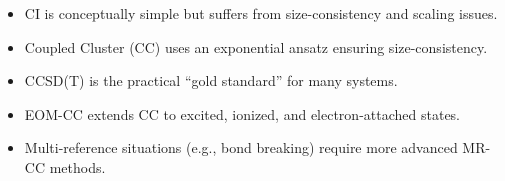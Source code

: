 \documentclass[12pt]{article}
\begin{document}
\begin{itemize}
    \item CI is conceptually simple but suffers from size-consistency and scaling issues.
    \item Coupled Cluster (CC) uses an exponential ansatz ensuring size-consistency.
    \item CCSD(T) is the practical ``gold standard'' for many systems.
    \item EOM-CC extends CC to excited, ionized, and electron-attached states.
    \item Multi-reference situations (e.g., bond breaking) require more advanced MR-CC methods.
\end{itemize}
\end{document}
